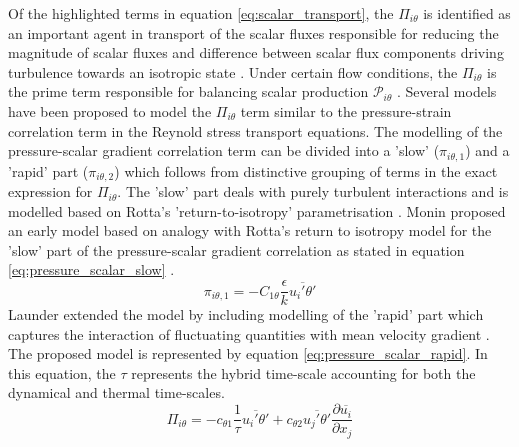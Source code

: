 Of the highlighted terms in equation \ref{eq:scalar_transport}, the $\Pi_{i\theta}$ is identified as an important agent in transport of the scalar fluxes \cite{Younis2005} responsible for reducing the magnitude of scalar fluxes and difference between scalar flux components driving turbulence towards an isotropic state \cite{Rogers1989} \cite{Heinze2016}. Under certain flow conditions, the $\Pi_{i\theta}$ is the prime term responsible for balancing scalar production $\mathcal{P}_{i\theta}$ \cite{Rossi2009}. Several models have been proposed to model the $\Pi_{i\theta}$ term similar to the pressure-strain correlation term in the Reynold stress transport equations. The modelling of the pressure-scalar gradient correlation term can be divided into a 'slow' ($\pi_{i\theta,1}$) and a 'rapid' part ($\pi_{i\theta,2}$) which follows from distinctive grouping of terms in the exact expression for $\Pi_{i\theta}$. The 'slow' part deals with purely turbulent interactions and is modelled based on Rotta's 'return-to-isotropy' parametrisation \cite{Rotta1951}. Monin \cite{Monin1965} proposed an early model based on analogy with Rotta's return to isotropy model for the 'slow' part of the pressure-scalar gradient correlation as stated in equation \ref{eq:pressure_scalar_slow} \cite{Younis2005}. 
\begin{equation}
\label{eq:pressure_scalar_slow}
\pi_{i\theta,1} = -C_{1\theta}\frac{\epsilon}{k}\overline{u_{i}'\theta'}
\end{equation}      
Launder \cite{Launder1975} extended the model by including modelling of the 'rapid' part which captures the interaction of fluctuating quantities with mean velocity gradient \cite{Wikstrom1998}. The proposed model is represented by equation \ref{eq:pressure_scalar_rapid}. In this equation, the $\tau$ represents the hybrid time-scale accounting for both the dynamical and thermal time-scales. 
\begin{equation}
\label{eq:pressure_scalar_rapid}
\Pi_{i\theta} = -c_{\theta1}\frac{1}{\tau}\overline{u_{i}'\theta'} + c_{\theta2}\overline{u_{j}'\theta'}\frac{\partial \overline{u_{i}}}{\partial x_{j}}
\end{equation}
